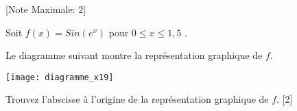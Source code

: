 \begin{question}
  \hspace*{\fill} [Note Maximale: 2]\par
  \medskip
  \noindent Soit $f(x) = Sin(e^x)$ pour $0 \le x \le 1,5$ .\par
  \medskip
  \begin{center} %
    \noindent Le diagramme suivant montre la représentation graphique de $f$.\par
    \texttt{[image: diagramme\_x19]}\par
  \end{center} %

  \medskip
  \noindent Trouvez l'abscisse à l'origine de la représentation graphique de $f$.\hspace*{\fill} [2]\par
  
\end{question}
